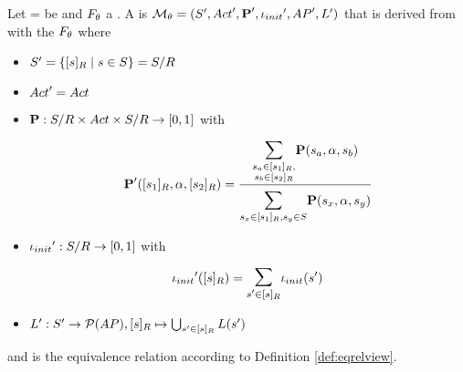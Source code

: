 \documentclass[preview]{standalone}
\begin{document}
\begin{definition}
	
	Let \chgph = \chgphtuple be \chgphN and ${F_{{\theta}}}$ a \grpfctN. A \emph{\viewN} is \chgphN ${{{{\mathcal{M}}}}_{{\theta}}} = {{({S}', {Act}', {\textbf{P}}', {\iota_{init}}', {AP}', {L}')}}$ that is derived from \mdp with the \grpfctN ${F_{{\theta}}}$ where
	
	\begin{itemize}
				\item ${S}' = \{ {[{s}]_{{R}}} \mid {s} \in {S} \} = {{{S}}/{R}}$
				
				\item ${Act}' = {Act}$
				
				
				\item ${\textbf{P}} : {{{S}}/{R}} \times {Act} \times {{\ensuremath{{S}}}/\ensuremath{{R}}} \to [0,1]$ with 
				\[ 
				\probtfunc'(\eqclassv[\state_1], \action, \eqclassv[\state_2]) = 
				\frac
				{\bbigsum{\substack{\state_a \in \eqclassv[\state_1], \\ \state_b \in \eqclassv[\state_2]}}\probtfunc(\state_a, \action, \state_b) }
				{\bbigsum{\state_x \in \eqclassv[\state_1], \state_y \in \states} \probtfunc(\state_x, \action, \state_y)}
				\]
				
				
				\item ${\iota_{init}}' : {{{S}}/{R}} \to [0,1]$ with 
				\[
				\initdistrib'(\eqclassv) = \bbigsum{\state' \in \eqclassv} \initdistrib(\state')
				\]
							
				\item ${L}': {S}' \to {\mathcal{P}(\ensuremath{{AP}})}, {{[{s}]_{{R}}}} \mapsto \bigcup_{{s}' \in {\ensuremath{{[{s}]_{{R}}}}}} {L}({s}')$
				
			\end{itemize}
	and \eqrelview is the equivalence relation according to Definition \ref{def:eqrelview}.
	

	\label{def:view}	
\end{definition}
\end{document}
